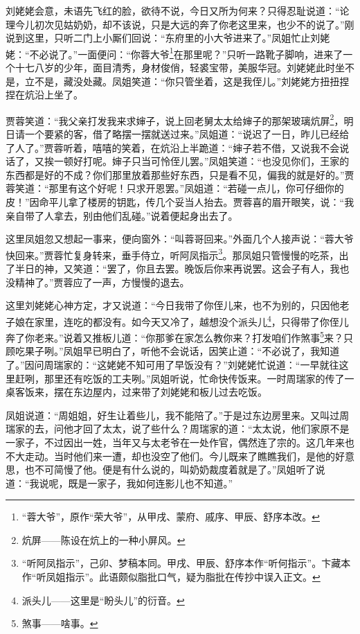 \par 刘姥姥会意，未语先飞红的脸，欲待不说，今日又所为何来？只得忍耻说道：“论理今儿初次见姑奶奶，却不该说，只是大远的奔了你老这里来，也少不的说了。”刚说到这里，只听二门上小厮们回说：“东府里的小大爷进来了。”凤姐忙止刘姥姥：“不必说了。”一面便问：“你蓉大爷\footnote{“蓉大爷”，原作“荣大爷”，从甲戌、蒙府、戚序、甲辰、舒序本改。}在那里呢？”只听一路靴子脚响，进来了一个十七八岁的少年，面目清秀，身材俊俏，轻裘宝带，美服华冠。刘姥姥此时坐不是，立不是，藏没处藏。凤姐笑道：“你只管坐着，这是我侄儿。”刘姥姥方扭扭捏捏在炕沿上坐了。
\par 贾蓉笑道：“我父亲打发我来求婶子，说上回老舅太太给婶子的那架玻璃炕屏\footnote{炕屏——陈设在炕上的一种小屏风。}，明日请一个要紧的客，借了略摆一摆就送过来。”凤姐道：“说迟了一日，昨儿已经给了人了。”贾蓉听着，嘻嘻的笑着，在炕沿上半跪道：“婶子若不借，又说我不会说话了，又挨一顿好打呢。婶子只当可怜侄儿罢。”凤姐笑道：“也没见你们，王家的东西都是好的不成？你们那里放着那些好东西，只是看不见，偏我的就是好的。”贾蓉笑道：“那里有这个好呢！只求开恩罢。”凤姐道：“若碰一点儿，你可仔细你的皮！”因命平儿拿了楼房的钥匙，传几个妥当人抬去。贾蓉喜的眉开眼笑，说：“我亲自带了人拿去，别由他们乱碰。”说着便起身出去了。
\par 这里凤姐忽又想起一事来，便向窗外：“叫蓉哥回来。”外面几个人接声说：“蓉大爷快回来。”贾蓉忙复身转来，垂手侍立，听阿凤指示\footnote{“听阿凤指示”，己卯、梦稿本同。甲戌、甲辰、舒序本作“听何指示”。卞藏本作“听凤姐指示”。此语颇似脂批口气，疑为脂批在传抄中误入正文。}。那凤姐只管慢慢的吃茶，出了半日的神，又笑道：“罢了，你且去罢。晚饭后你来再说罢。这会子有人，我也没精神了。”贾蓉应了一声，方慢慢的退去。
\par 这里刘姥姥心神方定，才又说道：“今日我带了你侄儿来，也不为别的，只因他老子娘在家里，连吃的都没有。如今天又冷了，越想没个派头儿\footnote{派头儿——这里是“盼头儿”的衍音。}，只得带了你侄儿奔了你老来。”说着又推板儿道：“你那爹在家怎么教你来？打发咱们作煞事\footnote{煞事——啥事。}来？只顾吃果子咧。”凤姐早已明白了，听他不会说话，因笑止道：“不必说了，我知道了。”因问周瑞家的：“这姥姥不知可用了早饭没有？”刘姥姥忙说道：“一早就往这里赶咧，那里还有吃饭的工夫咧。”凤姐听说，忙命快传饭来。一时周瑞家的传了一桌客饭来，摆在东边屋内，过来带了刘姥姥和板儿过去吃饭。
\par 凤姐说道：“周姐姐，好生让着些儿，我不能陪了。”于是过东边房里来。又叫过周瑞家的去，问他才回了太太，说了些什么？周瑞家的道：“太太说，他们家原不是一家子，不过因出一姓，当年又与太老爷在一处作官，偶然连了宗的。这几年来也不大走动。当时他们来一遭，却也没空了他们。今儿既来了瞧瞧我们，是他的好意思，也不可简慢了他。便是有什么说的，叫奶奶裁度着就是了。”凤姐听了说道：“我说呢，既是一家子，我如何连影儿也不知道。”
